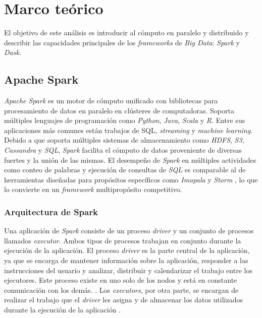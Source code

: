 \chapter{Marco teórico}

\noindent El objetivo de este análisis es introducir al cómputo en paralelo y distribuido y describir las capacidades principales de los \textit{frameworks}  de \textit{Big Data}: \textit{Spark} y \textit{Dask}.

\newpage


\section{Apache Spark}

\textit{Apache Spark} es un motor de cómputo unificado con bibliotecas para procesamiento de datos en paralelo en clústeres de computadoras. Soporta múltiples lenguajes de programación como \textit{Python}, \textit{Java}, \textit{Scala} y \textit{R}. Entre sus aplicaciones más comunes están trabajos de SQL, \textit{streaming} y \textit{machine learning}\cite{sparkguide}. Debido a que soporta múltiples sistemas de almacenamiento como \textit{HDFS}, \textit{S3}, \textit{Cassandra} y \textit{SQL}, \textit{Spark} facilita el cómputo de datos proveniente de diversas fuertes y la unión de las mismas. El desempeño de \textit{Spark} en múltiples actividades como conteo de palabras y ejecución de consultas de \textit{SQL} es comparable al de herramientas diseñadas para propósitos específicos como \textit{Imapala} y \textit{Storm} \cite{sparkberkeley}, lo que lo convierte en un \textit{framework} multipropósito competitivo.

\subsection{Arquitectura de Spark}

Una aplicación de \textit{Spark} consiste de un proceso \textit{driver} y un conjunto de procesos llamados \textit{executor}. Ambos tipos de procesos trabajan en conjunto durante la ejecución de la aplicación. El proceso \textit{driver} es la parte central de la aplicación, ya que se encarga de mantener información sobre la aplicación, responder a las instrucciones del usuario y analizar, distribuir y calendarizar el trabajo entre los ejecutores. Este proceso existe en uno solo de los nodos y está en constante comunicación con los demás. \cite{sparkguide}. Los \textit{executors}, por otra parte, se encargan de realizar el trabajo que el \textit{driver} les asigna y de almacenar los datos utilizados durante la ejecución de la aplicación \cite{sparkclusteroverview}.

